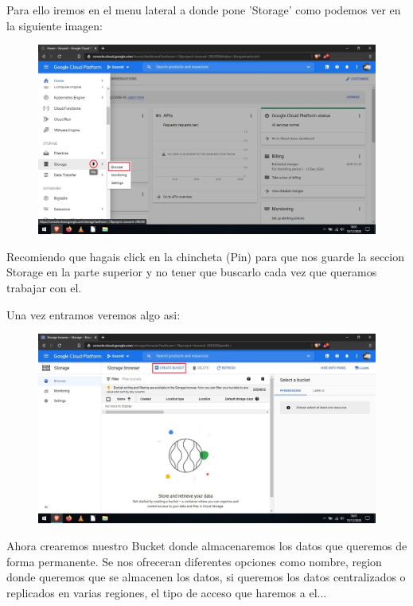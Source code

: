\documentclass[a4paper,10pt]{article}
\begin{document}
Para ello iremos en el menu lateral a donde pone 'Storage' como podemos ver en la siguiente imagen:

\begin{figure}[H]
\begin{center}
\includegraphics[width=500pt]{./fotos/GoogleCloud/9 - GC (V).jpg}
\end{center}
\end{figure}

Recomiendo que hagais click en la chincheta (Pin) para que nos guarde la seccion Storage en la parte superior y no tener que buscarlo cada vez que queramos trabajar con el.

Una vez entramos veremos algo asi:

\begin{figure}[H]
\begin{center}
\includegraphics[width=500pt]{./fotos/GoogleCloud/10 - GC.jpg}
\end{center}
\end{figure}

Ahora crearemos nuestro Bucket donde almacenaremos los datos que queremos de forma permanente. Se nos ofreceran diferentes opciones como nombre, region donde queremos que se almacenen los datos, si queremos los datos centralizados o replicados en varias regiones, el tipo de acceso que haremos a el... 
\end{document}
